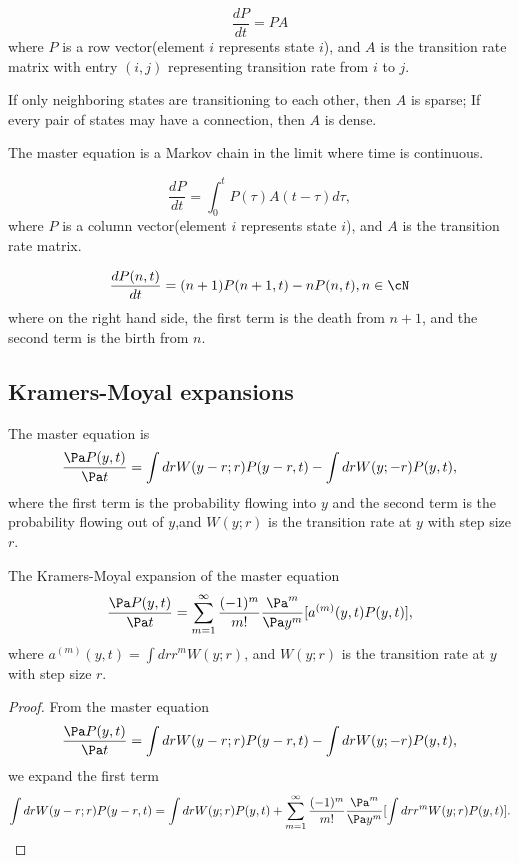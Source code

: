 \begin{refsection}
\begin{definition}
	$$\frac{dP}{dt} = PA$$
	where $P$ is a row vector(element $i$ represents state $i$), and $A$ is the transition rate matrix with entry $(i,j)$ representing transition rate from $i$ to $j$.
\end{definition}

\begin{remark}[structure of $A$]
	If only neighboring states are transitioning to each other, then $A$ is sparse; If every pair of states may have a connection, then $A$ is dense.
\end{remark}

\begin{remark}
	The master equation is a Markov chain in the limit where time is continuous.
\end{remark}


\begin{definition}
	$$\frac{dP}{dt} = \int_0^t P(\tau)A(t-\tau)d\tau,$$
	where $P$ is a column vector(element $i$ represents state $i$), and $A$ is the transition rate matrix. 
\end{definition}


\begin{example}
	$$\frac{dP(n,t)}{dt} = (n+1)P(n+1,t) - nP(n,t),n\in \cN$$
	where on the right hand side, the first term is the death from $n+1$, and the second term is the birth from $n$.
\end{example}


\subsection{Kramers-Moyal expansions}

\begin{lemma}
The master equation is
$$\frac{\Pa P(y,t)}{\Pa t} = \int dr W(y-r;r)P(y-r,t) - \int dr W(y;-r)P(y,t),$$
where the first term is the probability flowing into $y$ and the second term is the probability flowing out of $y$,and $W(y;r)$ is the transition rate at $y$ with step size $r$. 
\end{lemma}



\begin{lemma}
The Kramers-Moyal expansion of the master equation
$$\frac{\Pa P(y,t)}{\Pa t} = \sum_{m=1}^\infty \frac{(-1)^m}{m!} \frac{\Pa^m}{\Pa y^m}[a^{(m)}(y,t)P(y,t)],$$
where 
$a^{(m)}(y,t) = \int dr r^m W(y;r)$, and $W(y;r)$ is the transition rate at $y$ with step size $r$. 
\end{lemma}
\begin{proof}
From the master equation 
$$\frac{\Pa P(y,t)}{\Pa t} = \int dr W(y-r;r)P(y-r,t) - \int dr W(y;-r)P(y,t),$$
we expand the first term
$$\int dr W(y-r;r)P(y-r,t) = \int dr W(y;r)P(y,t) + \sum_{m=1}^\infty \frac{(-1)^m}{m!} \frac{\Pa^m}{\Pa y^m}[\int dr r^m W(y;r)P(y,t)].$$
\end{proof}




\end{refsection}

